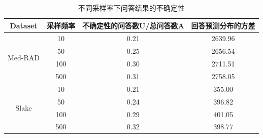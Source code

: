 %
\begin{table}
	\caption{\label{sample_exm}不同采样率下问答结果的不确定性}
	\centering
	\small %
	\begin{tabular}{c|ccc}
		\hline Dataset & 采样频率 & 不确定性的问答数U/总问答数A & 回答预测分布的方差 \\
		\hline \multirow{4}{*}{Med-RAD} & 10 & 0.21 & 2639.96 \\
		& 50 & 0.25 & 2656.54 \\
		& 100 & 0.30 & 2711.51 \\
		& 500 & 0.31 & 2758.05 \\
		\hline \multirow{4}{*}{Slake} & 10 & 0.21 & 355.00 \\
		& 50 & 0.24 & 396.82 \\
		& 100 & 0.29 & 401.05 \\
		& 500 & 0.32 & 398.77 \\
		\hline
	\end{tabular}
\end{table}
